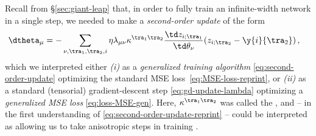 Recall from \S\ref{sec:giant-leap} that, in order to fully train an infinite-width network in a single step, we needed to make a \emph{second-order update} of the form
\begin{align}\label{eq:second-order-update-reprint}
\dtheta_\mu &=  - \sum_{\nu,\tra_1,\tra_2,i}\eta \lambda_{\mu\nu} \kappa^{\tra_1\tra_2}\frac{\td z_{i;\tra_1}}{\td \theta_\nu} (z_{i;\tra_2}-\y{i}{\tra_2})\, ,  %
\end{align}
which we interpreted either 
\emph{(i)} as a \emph{generalized training algorithm}
\eqref{eq:second-order-update} optimizing the standard MSE loss~\eqref{eq:MSE-loss-reprint}, or \emph{(ii)} as a standard (tensorial) gradient-descent step \eqref{eq:gd-update-lambda} optimizing a \emph{generalized MSE loss} \eqref{eq:loss-MSE-gen}. Here, $\kappa^{\tra_1\tra_2}$ was called the , and -- in the first understanding of \eqref{eq:second-order-update-reprint} -- could be interpreted as allowing us to take anisotropic steps in training . 


